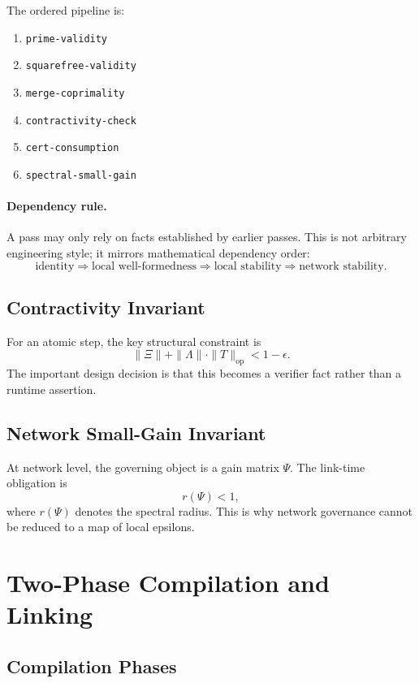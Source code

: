 \documentclass[11pt]{article}
\begin{document}
The ordered pipeline is:

\begin{enumerate}[leftmargin=2em]
  \item \texttt{prime-validity}
  \item \texttt{squarefree-validity}
  \item \texttt{merge-coprimality}
  \item \texttt{contractivity-check}
  \item \texttt{cert-consumption}
  \item \texttt{spectral-small-gain}
\end{enumerate}

\paragraph{Dependency rule.}
A pass may only rely on facts established by earlier passes. This is not arbitrary engineering style; it mirrors mathematical dependency order:
\[
\text{identity} \Rightarrow \text{local well-formedness} \Rightarrow \text{local stability} \Rightarrow \text{network stability}.
\]

\subsection{Contractivity Invariant}

For an atomic step, the key structural constraint is
\[
\|\Xi\| + \|\Lambda\| \cdot \|T\|_{\mathrm{op}} < 1 - \epsilon.
\]
The important design decision is that this becomes a verifier fact rather than a runtime assertion.

\subsection{Network Small-Gain Invariant}

At network level, the governing object is a gain matrix \(\Psi\). The link-time obligation is
\[
r(\Psi) < 1,
\]
where \(r(\Psi)\) denotes the spectral radius. This is why network governance cannot be reduced to a map of local epsilons.

\section{Two-Phase Compilation and Linking}

\subsection{Compilation Phases}
\end{document}
